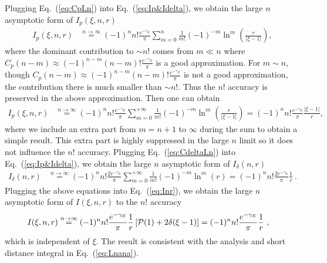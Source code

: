 \documentclass[a4paper,11pt]{article}
\begin{document}
Plugging Eq.~(\ref{eq:CpLn}) into Eq.~(\ref{eq:Ip&Idelta}), we obtain the large $n$ asymptotic form of $I_{p}(\xi,n,r)$
\begin{align}
I_{p}(\xi, n, r) &\stackrel{n \rightarrow \infty}{=} (-1)^n n! \frac{e^{-\gamma_E}}{\pi} \sum_{m=0}^{n} \frac{1}{m!} (-1)^{-m} \ln^{m}\left(\frac{r}{|\xi-1|}\right),
\end{align}
where the dominant contribution to $\sim n!$ comes from $m \ll n$ where $C_p(n-m) \approx (-1)^{n-m} (n-m)! \frac{e^{-\gamma_E}}{\pi}$ is a good approximation. For $m \sim n$, though $C_p(n-m) \approx (-1)^{n-m} (n-m)! \frac{e^{-\gamma_E}}{\pi}$ is not a good approximation, the contribution there is much smaller than $\sim n!$. Thus the $n!$ accuracy is preserved in the above approximation. Then one can obtain
\begin{align}
I_{p}(\xi, n,r) &\stackrel{n \rightarrow \infty}{=} (-1)^n n! \frac{e^{-\gamma_E}}{\pi} \sum_{m=0}^{+\infty} \frac{1}{m!} (-1)^{-m} \ln^{m}\left(\frac{r}{|\xi-1|}\right) = (-1)^n n! \frac{e^{-\gamma_E}}{\pi} \frac{|\xi-1|}{r},
\end{align}
where we include an extra part from $m=n+1$ to $\infty$ during the sum to obtain a simple result. This extra part is highly suppressed in the large $n$ limit so it does not influence the $n!$ accuracy.
Plugging Eq.~(\ref{eq:CdeltaLn}) into Eq.~(\ref{eq:Ip&Idelta}), we obtain the large $n$ asymptotic form of $I_{\delta}(n,r)$
\begin{align}
I_{\delta}(n,r) &\stackrel{n \rightarrow \infty}{=} (-1)^n n! \frac{2e^{-\gamma_E}}{\pi} \sum_{m=0}^{+\infty} \frac{1}{m!} (-1)^{-m} \ln^{m}\left(r\right) = (-1)^n n! \frac{2e^{-\gamma_E}}{\pi} \frac{1}{r} \ .
\end{align}
Plugging the above equations into Eq.~(\ref{eq:Inr}), we obtain the large $n$ asymptotic form of $I(\xi, n,r)$ to the $n!$ accuracy
\begin{align}\label{eq:FTinlargen}
&I(\xi, n,r) \stackrel{n \rightarrow \infty}{=} (-1)^n n! \frac{e^{-\gamma_E}}{\pi} \frac{1}{r}\left[{\cal P}(1) + 2\delta(\xi-1)\right] = (-1)^n n! \frac{e^{-\gamma_E}}{\pi} \frac{1}{r} \ ,
\end{align}
which is independent of $\xi$. The result is consistent with the analysis and short distance integral in Eq.~(\ref{eq:Lnana}).
\end{document}
